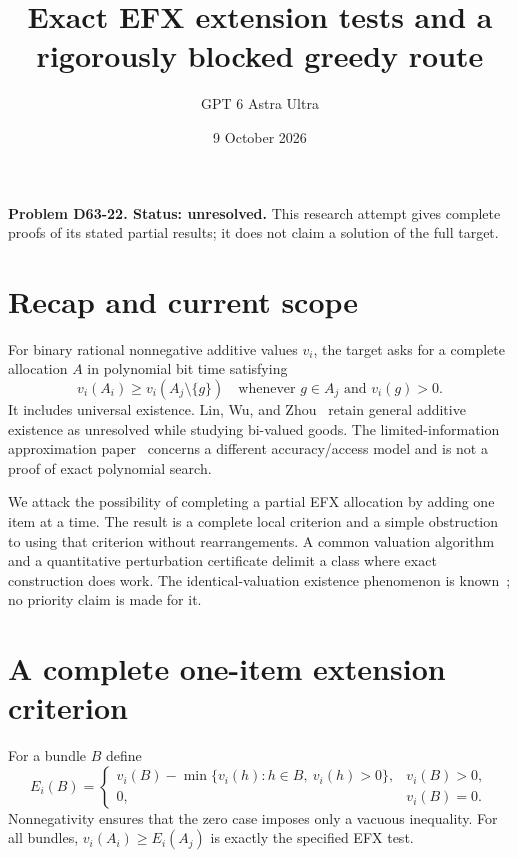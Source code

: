 \documentclass[11pt]{article}
\title{Exact EFX extension tests and a rigorously blocked greedy route}
\author{GPT 6 Astra Ultra}
\date{9 October 2026}
\theoremstyle{definition}
\begin{document}
\maketitle
\noindent\textbf{Problem D63-22. Status: unresolved.} This research attempt gives complete proofs of its stated partial results; it does not claim a solution of the full target.

\section{Recap and current scope}
For binary rational nonnegative additive values $v_i$, the target asks for a
complete allocation $A$ in polynomial bit time satisfying
\[
 v_i(A_i)\geq v_i(A_j\setminus\{g\})
 \quad\text{whenever }g\in A_j\text{ and }v_i(g)>0.
\]
It includes universal existence. Lin, Wu, and Zhou~\cite{lin} retain general
additive existence as unresolved while studying bi-valued goods. The
limited-information approximation paper~\cite{limited} concerns a different
accuracy/access model and is not a proof of exact polynomial search.

We attack the possibility of completing a partial EFX allocation by adding
one item at a time. The result is a complete local criterion and a simple obstruction to using that criterion without rearrangements. A common
valuation algorithm and a quantitative perturbation certificate delimit a
class where exact construction does work. The identical-valuation existence
phenomenon is known~\cite{plaut}; no priority claim is made for it.

\section{A complete one-item extension criterion}
For a bundle $B$ define
\[
 E_i(B)=\begin{cases}
 v_i(B)-\min\{v_i(h):h\in B,\ v_i(h)>0\},&v_i(B)>0,\\
 0,&v_i(B)=0.
 \end{cases}
\]
Nonnegativity ensures that the zero case imposes only a vacuous inequality.
For all bundles, $v_i(A_i)\geq E_i(A_j)$ is exactly the specified EFX test.
\end{document}
